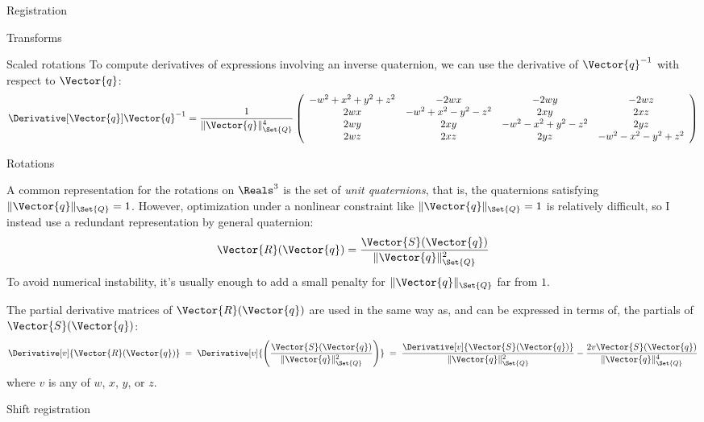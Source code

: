 \begin{plSection}{Registration}
\begin{plSection}{Transforms}
\begin{plSection}{Scaled rotations}
To compute derivatives of expressions
involving an inverse quaternion,
we can use the derivative of $\Vector{q}^{-1}$
with respect to $\Vector{q}$:
\begin{equation}
\Derivative[\Vector{q}]{\Vector{q}^{-1}}
=
\frac{1}{\|\Vector{q}\|_{\Set{Q}}^4}
\left(
\begin{array}{cccc}
-w^2+x^2+y^2+z^2 & -2wx              & -2wy              & -2wz \\
 2wx             & -w^2+x^2-y^2-z^2  &  2xy              &  2xz \\
 2wy             &   2xy             & -w^2-x^2+y^2-z^2  &  2yz \\
 2wz             &   2xz             &  2yz              &  -w^2-x^2-y^2+z^2 \\
\end{array}
\right)
\end{equation}

\end{plSection}%
\begin{plSection}{Rotations}
\label{sec:Rotations}

A common representation for the rotations on $\Reals^3$
is the set of {\it unit quaternions},
that is, the quaternions satisfying $\| \Vector{q} \|_{\Set{Q}} = 1$.
However, optimization under a nonlinear constraint
like $\| \Vector{q} \|_{\Set{Q}} = 1$ is relatively difficult,
so I instead use a redundant representation by general quaternion:
\begin{equation}
\Vector{R}(\Vector{q}) = 
\frac{\Vector{S}(\Vector{q})}
{\| \Vector{q} \|_{\Set{Q}}^2}
\end{equation}
To avoid numerical instability, it's usually enough
to add a small penalty for $\| \Vector{q} \|_{\Set{Q}}$ far from $1$.

The partial derivative matrices of $\Vector{R}(\Vector{q})$ are used in the
same way as,
and can be expressed in terms of,
the partials of $\Vector{S}(\Vector{q})$:
\begin{equation}
\Derivative[v]{\Vector{R}(\Vector{q})}
\; = \;
\Derivative[v]
{\left(
\frac{\Vector{S}(\Vector{q})}{\| \Vector{q} \|_{\Set{Q}}^2}
\right)}
\; = \;
\frac{\Derivative[v]{\Vector{S}(\Vector{q})}}
{\| \Vector{q} \|_{\Set{Q}}^2}
-
\frac{2v \Vector{S}(\Vector{q})}{\| \Vector{q} \|_{\Set{Q}}^4}
\end{equation}
where $v$ is any of $w$, $x$, $y$, or $z$.

\end{plSection}%
\begin{plSection}{Shift registration}
\label{sec:Shift-registration}


\end{plSection}
\end{plSection}
\end{plSection}
